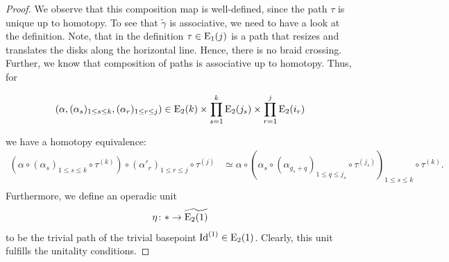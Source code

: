 \begin{proof}
    We observe that this composition map is well-defined, since the path $\tau$
    is unique up to homotopy. To see that $\widetilde{\gamma}$ is associative, we
    need to have a look at the definition. Note, that in the definition $\tau
    \in \operatorname{E}_1(j)$ is a path that resizes and translates the disks along the
    horizontal line. Hence, there is no braid crossing. Further, we know that composition of paths
    is associative up to homotopy. Thus, for 

    $$(\alpha, (\alpha_s)_{1 \leq s \leq k}, (\alpha_r)_{1 \leq r \leq j}) \in
    \operatorname{E}_2(k) \times \prod_{s=1}^{k} \operatorname{E}_2(j_s) \times \prod_{r=1}^{j} \operatorname{E}_2(i_r)$$

    we have a homotopy equivalence:
    \begin{align*}
        \left(\alpha \circ (\alpha_s)_{1 \leq s \leq k} \circ \tau^{(k)}\right) \circ \left(\alpha'_r\right)_{1 \leq r \leq j} \circ \tau^{(j)} 
        &\simeq 
        \alpha \circ \left(\alpha_s \circ (\alpha_{g_s+q})_{1 \leq q \leq j_s} \circ \tau^{(j_s)}\right)_{1 \leq s \leq k} \circ \tau^{(k)}. \\
    \end{align*}
    Furthermore, we define an operadic unit
    \[
        \eta \colon \ast \to \widetilde{\operatorname{E}_2(1)}
    \]
    to be the trivial path of the trivial basepoint $\operatorname{Id}^{(1)} \in \operatorname{E}_2(1)$. Clearly,
    this unit fulfills the unitality conditions.


\end{proof}
